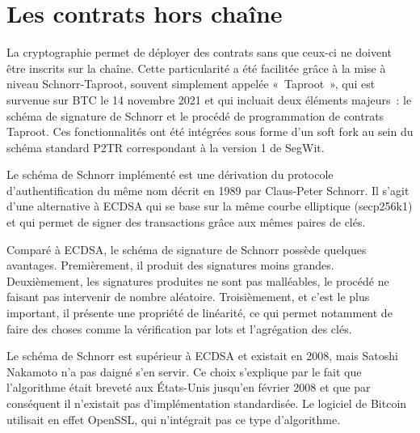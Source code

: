 \section*{Les contrats hors chaîne} %

La cryptographie permet de déployer des contrats sans que ceux-ci ne doivent être inscrits sur la chaîne. Cette particularité a été facilitée grâce à la mise à niveau Schnorr-Taproot, souvent simplement appelée «~Taproot~», qui est survenue sur BTC le 14 novembre 2021 et qui incluait deux éléments majeurs~: le schéma de signature de Schnorr et le procédé de programmation de contrats Taproot. Ces fonctionnalités ont été intégrées sous forme d'un soft fork au sein du schéma standard P2TR correspondant à la version 1 de SegWit.

Le schéma de Schnorr implémenté est une dérivation du protocole d'authentification du même nom décrit en 1989 par Claus-Peter Schnorr. Il s'agit d'une alternative à ECDSA qui se base sur la même courbe elliptique (secp256k1) et qui permet de signer des transactions grâce aux mêmes paires de clés.

Comparé à ECDSA, le schéma de signature de Schnorr possède quelques avantages. Premièrement, il produit des signatures moins grandes. Deuxièmement, les signatures produites ne sont pas malléables, le procédé ne faisant pas intervenir de nombre aléatoire. Troisièmement, et c'est le plus important, il présente une propriété de linéarité, ce qui permet notamment de faire des choses comme la vérification par lots et l'agrégation des clés.

Le schéma de Schnorr est supérieur à ECDSA et existait en 2008, mais Satoshi Nakamoto n'a pas daigné s'en servir. Ce choix s'explique par le fait que l'algorithme était breveté aux États-Unis jusqu'en février 2008 et que par conséquent il n'existait pas d'implémentation standardisée. Le logiciel de Bitcoin utilisait en effet OpenSSL, qui n'intégrait pas ce type d'algorithme.

